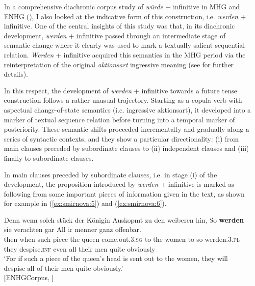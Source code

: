 \documentclass[output=paper,colorlinks,citecolor=brown]{langscibook}
\begin{document}
In a comprehensive diachronic corpus study of \emph{würde} + infinitive in MHG and ENHG (\cite{Smirnova2006}), I also looked at the indicative form of this construction, i.e. \emph{werden} + infinitive. One of the central insights of this study was that, in its diachronic development, \emph{werden} + infinitive passed through an intermediate stage of semantic change where it clearly was used to mark a textually salient sequential relation. \emph{Werden} + infinitive acquired this semantics in the MHG period via the reinterpretation of the original \textit{aktionsart} ingressive meaning (see \cite[259--267]{Smirnova2006} for further details). 
\par In this respect, the development of \emph{werden} + infinitive towards a future tense construction follows a rather unusual trajectory. Starting as a copula verb with aspectual change-of-state semantics (i.e. ingressive aktionsart), it developed into a marker of textual sequence relation before turning into a temporal marker of posteriority. These semantic shifts proceeded incrementally and gradually along a series of syntactic contexts, and they show a particular directionality: (i) from main clauses preceded by subordinate clauses to (ii) independent clauses and (iii) finally to subordinate clauses.
\par In main clauses preceded by subordinate clauses, i.e. in stage (i) of the development, the proposition introduced by \emph{werden} + infinitive is marked as following from some important pieces of information given in the text, as shown for example in (\ref{ex:smirnova:5}) and (\ref{ex:smirnova:6}). 

\ea\label{ex:smirnova:5}
\gll Denn wenn solch stück der Königin Auskopmt zu den weiberen hin, So \textbf{werden} sie verachten gar All ir menner ganz offenbar.\\
	 then when such piece the queen come.out.\textsc{3.sg} to the women to so werden.\textsc{3.pl} they despise.\textsc{inf} even all their men quite obviously \\
\glt `For if such a piece of the queen's head is sent out to the women, they will despise all of their men quite obviously.'\\
\hfill [ENHGCorpus, \citet[262]{Smirnova2006}]
\z
\end{document}
